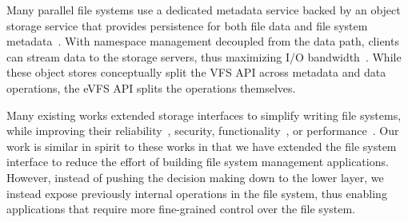 Many parallel file systems use a dedicated metadata service backed by an object storage service that provides persistence for both file data and file system metadata~\cite{schwan2003lustre}. With namespace management decoupled from the data path, clients can stream data to the storage servers, thus maximizing I/O bandwidth~\cite{weil2006ceph}. While these object stores conceptually split the VFS API across metadata and data operations, the eVFS API splits the operations themselves.


Many existing works extended storage interfaces to simplify writing file systems, while improving their reliability~\cite{Sivathanu06}, security, functionality~\cite{shin2016isotope}, or performance~\cite{zhang2012nameless,anand08rangewrites}. Our work is similar in spirit to these works in that we have extended the file system interface to reduce the effort of building file system management applications. However, instead of pushing the decision making down to the lower layer, we instead expose previously internal operations in the file system, thus enabling applications that require more fine-grained control over the file system.

\vspace{-1ex}
